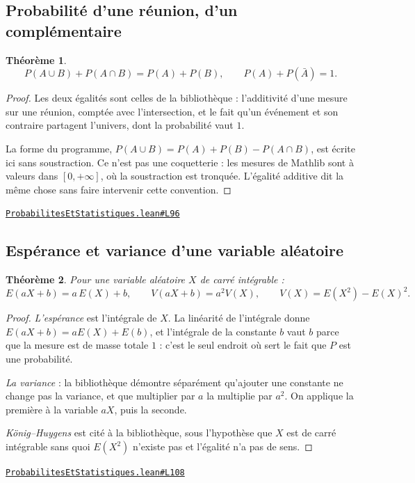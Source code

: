 \documentclass[11pt,a4paper]{article}
\theoremstyle{definition}
\theoremstyle{plain}
\newtheorem{theoreme}{Théorème}
\newcommand{\source}[2]{\par\smallskip\noindent\hfill{\footnotesize\href{#1}{\texttt{#2}}}\par\smallskip}
\begin{document}
\subsection{Probabilité d'une réunion, d'un complémentaire}

\begin{theoreme}
\[ P(A \cup B) + P(A \cap B) = P(A) + P(B) , \qquad P(A) + P(\bar A) = 1 . \]
\end{theoreme}

\begin{proof}
Les deux égalités sont celles de la bibliothèque : l'additivité d'une mesure sur une
réunion, comptée avec l'intersection, et le fait qu'un événement et son contraire
partagent l'univers, dont la probabilité vaut $1$.

\medskip\noindent
La forme du programme, $P(A \cup B) = P(A) + P(B) - P(A \cap B)$, est écrite ici sans
soustraction. Ce n'est pas une coquetterie : les mesures de Mathlib sont à valeurs dans
$[0, +\infty]$, où la soustraction est tronquée. L'égalité additive dit la même chose sans
faire intervenir cette convention.
\end{proof}
\source{https://github.com/Commutator-IO/learn-lean/blob/main/cours/02-lycee/09-probabilites-et-statistiques/ProbabilitesEtStatistiques.lean\#L96}{ProbabilitesEtStatistiques.lean\#L96}

\subsection{Espérance et variance d'une variable aléatoire}

\begin{theoreme}
Pour une variable aléatoire $X$ de carré intégrable :
\[ E(aX + b) = a\,E(X) + b , \qquad V(aX + b) = a^{2}V(X) , \qquad
   V(X) = E(X^{2}) - E(X)^{2} . \]
\end{theoreme}

\begin{proof}
\emph{L'espérance} est l'intégrale de $X$. La linéarité de l'intégrale donne
$E(aX + b) = a E(X) + E(b)$, et l'intégrale de la constante $b$ vaut $b$ parce que la
mesure est de masse totale $1$ : c'est le seul endroit où sert le fait que $P$ est une
probabilité.

\emph{La variance} : la bibliothèque démontre séparément qu'ajouter une constante ne change
pas la variance, et que multiplier par $a$ la multiplie par $a^{2}$. On applique la
première à la variable $aX$, puis la seconde.

\emph{König--Huygens} est cité à la bibliothèque, sous l'hypothèse que $X$ est de carré
intégrable \textemdash{} sans quoi $E(X^{2})$ n'existe pas et l'égalité n'a pas de sens.
\end{proof}
\source{https://github.com/Commutator-IO/learn-lean/blob/main/cours/02-lycee/09-probabilites-et-statistiques/ProbabilitesEtStatistiques.lean\#L108}{ProbabilitesEtStatistiques.lean\#L108}
\end{document}
